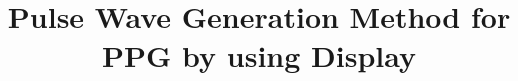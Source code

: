 \documentclass[manuscript,screen,review]{acmart}
\begin{document}
\title{Pulse Wave Generation Method for PPG by using Display}





\end{document}
